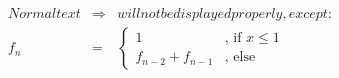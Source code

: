 \begin{eqnarray*}
  Normal text & \Rightarrow & will not be displayed properly, except:\\
  f_n &=& \left\lbrace 
    \begin{array}{ll} 
       1 & \text{, if } x \le 1\\
	   f_{n-2} + f_{n-1} & \text{, else}
    \end{array} \right.
\end{eqnarray*}
